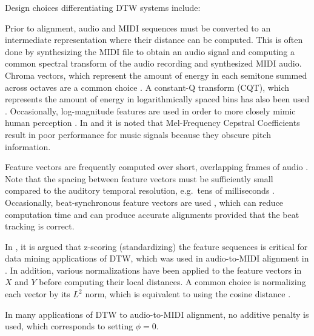 \documentclass{article}
\begin{document}
Design choices differentiating DTW systems include:
\begin{description}[topsep=1pt,itemsep=-1pt,leftmargin=5pt]
\item[Feature representation ($X$ and $Y$):] Prior to alignment, audio and MIDI sequences must be converted to an intermediate representation where their distance can be computed.
This is often done by synthesizing the MIDI file to obtain an audio signal and computing a common spectral transform of the audio recording and synthesized MIDI audio.
Chroma vectors, which represent the amount of energy in each semitone summed across octaves \cite{fujishima1999realtime} are a common choice \cite{hu2003polyphonic, ewert2012towards}.
A constant-Q transform (CQT), which represents the amount of energy in logarithmically spaced bins \cite{brown1991calculation} has also been used \cite{raffel2015large, dixon2005match, ellis2013aligning}.
Occasionally, log-magnitude features are used in order to more closely mimic human perception \cite{raffel2015large, ellis2013aligning, turetsky2003ground}.
In \cite{turetsky2003ground} and \cite{hu2003polyphonic} it is noted that Mel-Frequency Cepstral Coefficients result in poor performance for music signals because they obscure pitch information.
\item[Time scale ($t_X$ and $t_Y$):] Feature vectors are frequently computed over short, overlapping frames of audio \cite{dixon2005match, turetsky2003ground, hu2003polyphonic}.
Note that the spacing between feature vectors must be sufficiently small compared to the auditory temporal resolution, e.g.\ tens of milliseconds \cite{blauert1997spatial}.
Occasionally, beat-synchronous feature vectors are used \cite{raffel2015large,ellis2013aligning}, which can reduce computation time and can produce accurate alignments provided that the beat tracking is correct.
\item[Normalization:] In \cite{rakthanmanon2012searching}, it is argued that z-scoring (standardizing) the feature sequences is critical for data mining applications of DTW, which was used in audio-to-MIDI alignment in \cite{hu2003polyphonic}.
In addition, various normalizations have been applied to the feature vectors in $X$ and $Y$ before computing their local distances.
A common choice is normalizing each vector by its $L^2$ norm, which is equivalent to using the cosine distance \cite{turetsky2003ground, ewert2012towards, raffel2015large, ellis2013aligning}.
\item[Penalty ($\phi$):] In many applications of DTW to audio-to-MIDI alignment, no additive penalty is used, which corresponds to setting $\phi = 0$.

\end{description}
\end{document}
